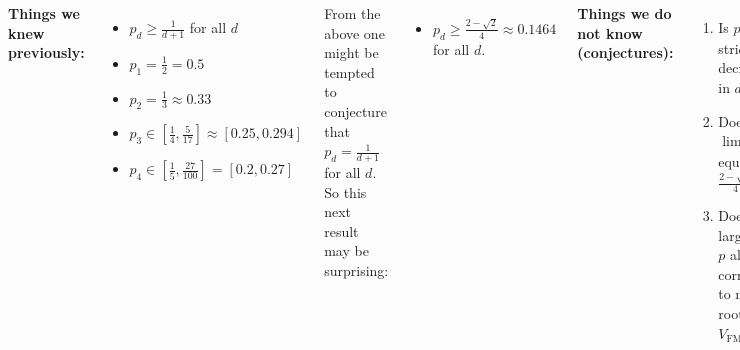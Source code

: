 \documentclass[25pt,margin=1in,innermargin=-7in,blockverticalspace=1\baselineskip]{tikzposter}
\newcommand{\edit}[1]{\textcolor{red}{#1}}
\newcommand{\FM}{\operatorname{FM}}
\begin{document}
\begin{columns}
{        %

        \textbf{Things we knew previously:} \begin{itemize}
        \item $p_d \geq \frac{1}{d+1}$ for all $d$
         \item $p_1 = \frac{1}{2} = 0.5$
         \item $p_2 = \frac{1}{3} \approx 0.33$ \hfill \cite{hoffman2017recurrence}
         \item $p_3 \in [\frac{1}{4}, \frac{5}{17}] \approx [0.25, 0.294]$ \hfill \cite{bailey2023critical}
         \item $p_4 \in [\frac{1}{5}, \frac{27}{100}] = [0.2, 0.27]$ \hfill \cite{bailey2023critical}
    \end{itemize}
    From the above one might be tempted to conjecture that $p_d = \frac{1}{d+1}$ for all $d$. So this next result may be surprising: %
    \begin{itemize}
         \item $p_d \geq \frac{2-\sqrt{2}}{4} \approx 0.1464$ for all $d$. \hfill \cite{beckman2019frog}
     \end{itemize}
    
    \textbf{Things we do not know (conjectures):}
        \begin{enumerate}
             \item Is $p_d$ strictly decreasing in $d$?
             \item Does $\lim_{d\to\infty } p_d$ equal $ \frac{2-\sqrt{2}}{4}$?
             \item Does a larger $d$ or $p$ always correspond to more root visits $V_{\FM}$?
        \end{enumerate}

}
\end{columns}
\end{document}
